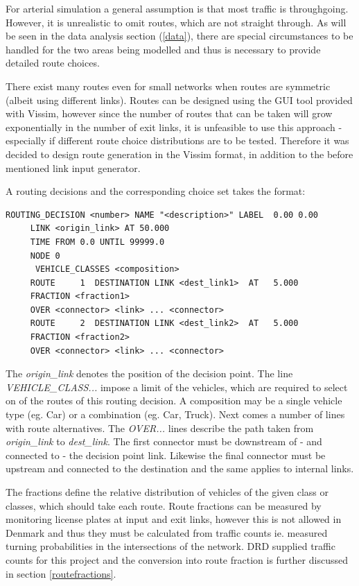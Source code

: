 For arterial simulation a general assumption is that most traffic is throughgoing. However, it is unrealistic to omit routes, which are not straight through. As will be seen in the data analysis section (\ref{data}), there are special circumstances to be handled for the two areas being modelled and thus is necessary to provide detailed route choices.

There exist many routes even for small networks when routes are symmetric (albeit using different links). Routes can be designed using the GUI tool provided with Vissim, however since the number of routes that can be taken will grow exponentially in the number of exit links, it is unfeasible to use this approach - especially if different route choice distributions are to be tested. Therefore it was decided to design route generation in the Vissim format, in addition to the before mentioned link input generator.

A routing decisions and the corresponding choice set takes the format:

\begin{verbatim}
ROUTING_DECISION <number> NAME "<description>" LABEL  0.00 0.00
     LINK <origin_link> AT 50.000
     TIME FROM 0.0 UNTIL 99999.0
     NODE 0
      VEHICLE_CLASSES <composition>
     ROUTE     1  DESTINATION LINK <dest_link1>  AT   5.000
     FRACTION <fraction1>
     OVER <connector> <link> ... <connector>
     ROUTE     2  DESTINATION LINK <dest_link2>  AT   5.000
     FRACTION <fraction2>
     OVER <connector> <link> ... <connector>
\end{verbatim}

The \textit{origin\_link} denotes the position of the decision point. The line \textit{VEHICLE\_CLASS...} impose a limit of the vehicles, which are required to select on of the routes of this routing decision. A composition may be a single vehicle type (eg. Car) or a combination (eg. Car, Truck). Next comes a number of lines with route alternatives. The \textit{OVER...} lines describe the path taken from \textit{origin\_link} to \textit{dest\_link}. The first connector must be downstream of - and connected to - the decision point link. Likewise the final connector must be upstream and connected to the destination and the same applies to internal links.

The fractions define the relative distribution of vehicles of the given class or classes, which should take each route. Route fractions can be measured by monitoring license plates at input and exit links, however this is not allowed in Denmark and thus they must be calculated from traffic counts ie. measured turning probabilities in the intersections of the network. DRD supplied traffic counts for this project and the conversion into route fraction is further discussed in section \ref{routefractions}.

